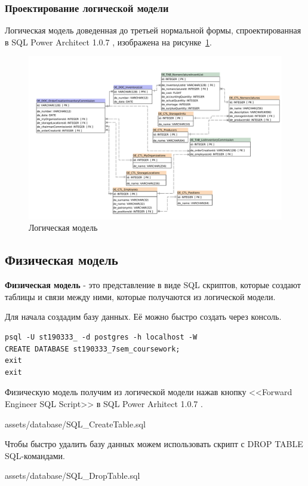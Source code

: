 
\subsubsection{Проектирование логической модели}

Логическая модель доведенная до третьей нормальной формы,
спроектированная в SQL Power Architect 1.0.7 \cite{SqlPowerArhitect},
изображена на рисунке~\ref{fig:ArchitectureDatabase}.

\begin{figure}[!h]
    \centering

    \includegraphics[width=18cm]
    {assets/database/LogicModel.SqlPowerArchitect.architect.pdf}

    \caption{Логическая модель}

    \label{fig:ArchitectureDatabase}
\end{figure}

\newpage
\subsection{Физическая модель}

\textbf{Физическая модель} - это представление в виде SQL скриптов, которые создают таблицы и связи между ними,
которые получаются из логической модели.

Для начала создадим базу данных. Её можно быстро создать через консоль.

\begin{lstlisting}[name=Создание базы данных в Postgres]
psql -U st190333_ -d postgres -h localhost -W
CREATE DATABASE st190333_7sem_coursework;
exit
exit
\end{lstlisting}

Физическую модель получим из логической модели нажав кнопку <<Forward Engineer SQL Script>>
в SQL Power Arhitect 1.0.7 \cite{SqlPowerArhitect}.


{assets/database/SQL_CreateTable.sql}

\newpage

Чтобы быстро удалить базу данных можем использовать скрипт с DROP TABLE SQL-командами.


{assets/database/SQL_DropTable.sql}

\newpage

